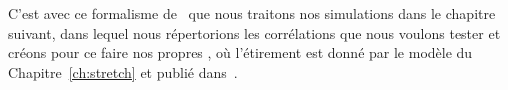 \documentclass[../main/main.tex]{subfiles}
\begin{document}
C'est avec ce formalisme de \bbc\ que nous traitons nos simulations dans le
chapitre suivant, dans lequel nous répertorions les corrélations que nous
voulons tester et créons pour ce faire nos propres \hostlib, où l'étirement est
donné par le modèle du Chapitre~\ref{ch:stretch} et publié
dans~\cite{nicolas2021}.

\clearpage

\thispagestyle{plain}
\vfill
\minilof
\vfill
\minilot
\vfill

% 
% 
\end{document}
